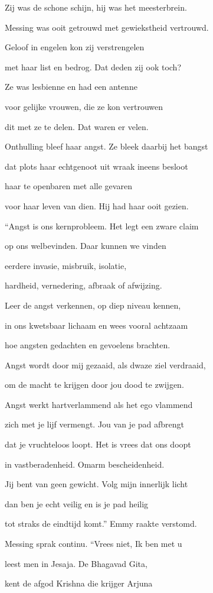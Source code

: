 Zij was de schone schijn,
hij was het meesterbrein.

Messing was ooit getrouwd
met gewiekstheid vertrouwd.

Geloof in engelen
kon zij verstrengelen

met haar list en bedrog.
Dat deden zij ook toch?

Ze was lesbienne
en had een antenne

voor gelijke vrouwen,
die ze kon vertrouwen

dit met ze te delen.
Dat waren er velen.

Onthulling bleef haar angst.
Ze bleek daarbij het bangst

dat plots haar echtgenoot
uit wraak ineens besloot

haar te openbaren
met alle gevaren

voor haar leven van dien.
Hij had haar ooit gezien.

“Angst is ons kernprobleem.
Het legt een zware claim

op ons welbevinden.
Daar kunnen we vinden

eerdere invasie,
misbruik, isolatie,

hardheid, vernedering,
afbraak of afwijzing.

Leer de angst verkennen,
op diep niveau kennen,

in ons kwetsbaar lichaam
en wees vooral achtzaam

hoe angsten gedachten
en gevoelens brachten.

Angst wordt door mij gezaaid,
als dwaze ziel verdraaid,

om de macht te krijgen
door jou dood te zwijgen.

Angst werkt hartverlammend
als het ego vlammend

zich met je lijf vermengt.
Jou van je pad afbrengt

dat je vruchteloos loopt.
Het is vrees dat ons doopt

in vastberadenheid.
Omarm bescheidenheid.

Jij bent van geen gewicht.
Volg mijn innerlijk licht

dan ben je echt veilig
en is je pad heilig

tot straks de eindtijd komt.”
Emmy raakte verstomd.

Messing sprak continu.
“Vrees niet, Ik ben met u

leest men in Jesaja.
De Bhagavad Gita,

kent de afgod Krishna
die krijger Arjuna

